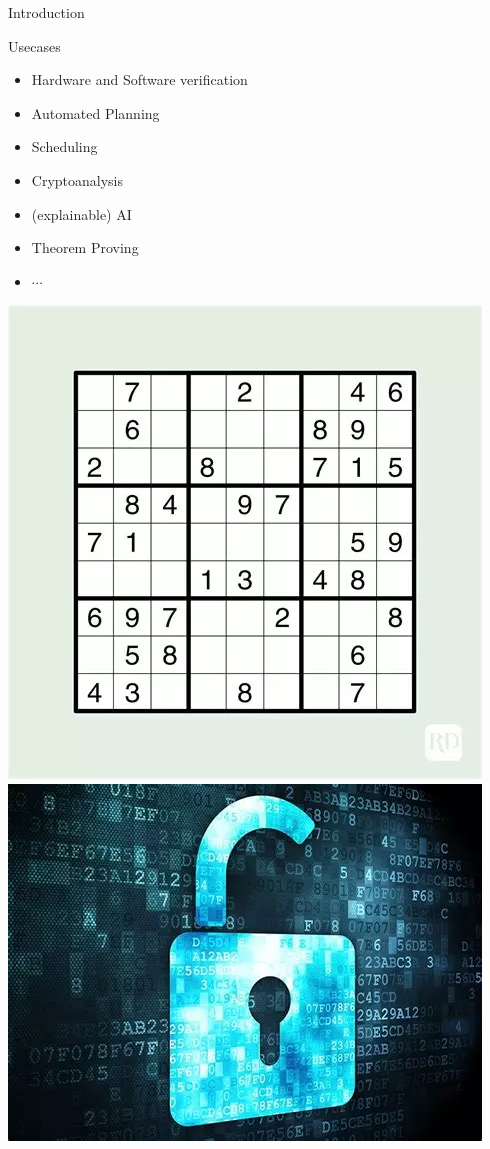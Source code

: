 \documentclass[]{sdqbeamer}
\begin{document}
\begin{frame}{Introduction}
    \begin{minipage}{.45\textwidth}
        \begin{block}{Usecases}
            \begin{itemize}
                \item Hardware and Software verification
                \item Automated Planning
                \item Scheduling
                \item Cryptoanalysis
                \item (explainable) AI
                \item Theorem Proving
                \item $\cdots$
            \end{itemize}
            \end{block}
    \end{minipage}
    \hfill
    \begin{minipage}{.45\textwidth}
        \includegraphics[scale=.35]{images/Sudoku.png}
        \includegraphics[scale=.35]{images/Cryptography.png}

\end{minipage}
\end{frame}
\end{document}
